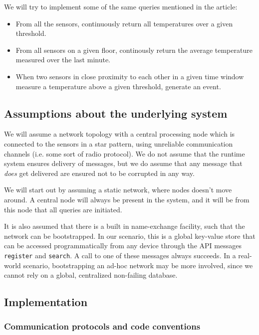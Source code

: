 We will try to implement some of the same queries mentioned in the
article:

\begin{itemize}
\item
  From all the sensors, continuously return all temperatures over a
  given threshold.

\item
  From all sensors on a given floor, continously return the average
  temperature measured over the last minute.

\item
  When two sensors in close proximity to each other in a given time
  window measure a temperature above a given threshold, generate an
  event.
\end{itemize}


\subsection{Assumptions about the underlying system}

We will assume a network topology with a central processing node
which is connected to the sensors in a star pattern, using
unreliable communication channels (i.e. some sort of radio protocol).
We do not assume that the runtime system ensures delivery of messages,
but we do assume that any message that \emph{does} get delivered are
ensured not to be corrupted in any way.

We will start out by assuming a static network, where nodes doesn't
move around. A central node will always be present in the system, and
it will be from this node that all queries are initiated.

It is also assumed that there is a built in name-exchange facility,
such that the network can be bootstrapped. In our scenario, this is a
global key-value store that can be accessed programmatically from any
device through the API messages \verb!register! and \verb!search!. A
call to one of these messages always succeeds. In a real-world
scenario, bootstrapping an ad-hoc network may be more involved, since
we cannot rely on a global, centralized non-failing database.


\subsection{Implementation}

\subsubsection{Communication protocols and code conventions}

